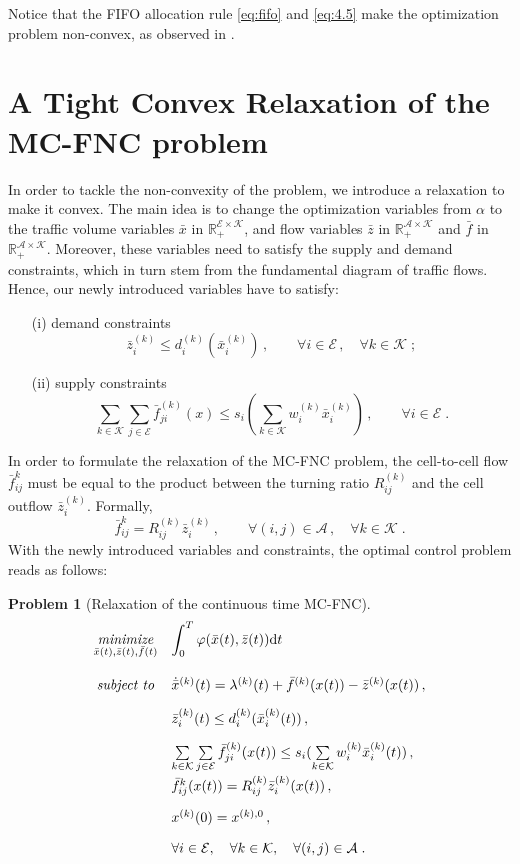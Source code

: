 \documentclass[preprint,12pt]{elsarticle}
\newtheorem{problem}{Problem}
\newcommand{\be}{\begin{equation}}
\newcommand{\ee}{\end{equation}}
\newcommand{\mc}{\mathcal}
\newcommand{\ba}{\begin{array}}
\newcommand{\ea}{\end{array}}
\newcommand{\R}{\mathbb{R}}
\renewcommand{\d}{\text{d}}
\begin{document}
Notice that the FIFO allocation rule \eqref{eq:fifo} and \eqref{eq:4.5} make the optimization problem non-convex, as observed in \cite{Schmitt2018}.

\section{A Tight Convex Relaxation of the MC-FNC problem}
 In order to tackle the non-convexity of the problem, we introduce a relaxation to make it convex. The main idea is to change the optimization variables from $\alpha$ to the traffic volume variables $\bar x$ in $\R_+^{\mc{E}\times\mc{K}}$, and flow variables $\bar z$ in $\R_+^{\mc{A}\times\mc{K}}$ and $\bar f $ in $\R_+^{\mc{A}\times\mc{K}}$. Moreover, these variables need to satisfy the supply and demand constraints, which in turn stem from the fundamental diagram of traffic flows. Hence, our newly introduced variables have to satisfy:
\begin{enumerate}
	\item[(i)] demand constraints
	\be\label{eq:dmnd}
		\bar{z}_i^{(k)} \leq d_i^{(k)}(\bar{x}_i^{(k)}) \, , \qquad \forall i \in \mc{E}\,, \quad \forall k \in \mc{K}\; ;
	\ee
	\item[(ii)]  supply constraints
	\be\label{eq:supp}
		\sum\limits_{k\in\mc{K}}{\sum\limits_{j\in\mc{E}}{\bar{f}_{ji}^{(k)}(x)}} \leq s_i(\sum\limits_{k\in\mc{K}}{w_i^{(k)}\bar{x}_i^{(k)}})\,, \qquad \forall i \in \mc{E}\;.
	\ee
\end{enumerate}

In order to formulate the relaxation of the MC-FNC problem, the cell-to-cell flow $\bar f_{ij}^{k}$ must be equal to the product between the turning ratio $R_{ij}^{(k)}$ and the cell outflow $\bar z_i^{(k)}$. Formally,
\be\label{eq:frz}
	\bar f_{ij}^{k} = R_{ij}^{(k)}\bar z_i^{(k)} \,, \qquad \forall (i,j) \in \mc{A} \,, \quad \forall k \in \mc{K}\;.
\ee
With the newly introduced variables and constraints, the optimal control problem reads as follows:
\begin{problem}[Relaxation of the continuous time MC-FNC]\label{problem2}
\be\label{eq:FNC_r}
	\ba{rcll}
	 & \underset{\bar x(t),\bar z(t),\bar f(t)}{\emph{minimize}}  & \displaystyle\int_0^T{\varphi(\bar x(t),\bar z(t)) \d t} \quad & \\[20pt]
	& \emph{subject to} & \dot{\bar{x}}^{(k)}(t) = \lambda^{(k)}(t)  + \bar{f}^{(k)}(x(t)) - \bar{z}^{(k)}(x(t) ) \,,  & \\[10pt]
	& & \bar{z}_i^{(k)}(t)  \leq d_i^{(k)}(\bar{x}_i^{(k)}(t) )\,,   & \\[10pt]
	& & \sum\limits_{k\in\mc{K}}{\sum\limits_{j\in\mc{E}}{\bar{f}_{ji}^{(k)}(x(t) )}} \leq s_i(\sum\limits_{k\in\mc{K}}{w_i^{(k)}\bar{x}_i^{(k)}(t) })\,,\\[10pt]
	& & \bar f_{ij}^{k}(x(t)) = R_{ij}^{(k)}\bar z_i^{(k)}(x(t) )\,, & \\[10pt]
	& & x^{(k)}(0) = x^{(k),0} \,, &\\[10pt]
	& & \forall i \in \mc{E},\quad \forall k \in \mc{K},\quad 
 \forall (i,j) \in \mc{A}\;.
	\ea
\ee
\end{problem}
\end{document}
